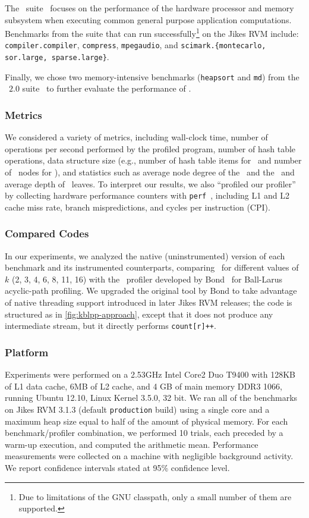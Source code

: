 The \specjvm\ suite~\cite{SpecJVM2008} focuses on the performance of the hardware processor and memory subsystem when executing common general purpose application computations. Benchmarks from the suite that can run successfully\footnote{Due to limitations of the GNU classpath, only a small number of them are supported.} on the Jikes RVM include: {\tt compiler.compiler}, {\tt compress}, {\tt mpegaudio}, and {\tt scimark.\{montecarlo, sor.large, sparse.large\}}.

Finally, we chose two memory-intensive benchmarks ({\tt heapsort} and {\tt md}) from the \javagrande\ $2.0$ suite~\cite{Bull99} to further evaluate the performance of \kblpp.

\subsubsection*{Metrics}
We considered a variety of metrics, including wall-clock time, number of operations per second performed by the profiled program, number of hash table operations, data structure size (e.g., number of hash table items for \blpp\ and number of \ksf\ nodes for \kblpp), and statistics such as average node degree of the \ksf\ and the \kipf\ and average depth of \kipf\ leaves. To interpret our results, we also ``profiled our profiler'' by collecting hardware performance counters with {\tt perf}~\cite{perf}, including L1 and L2 cache miss rate, branch mispredictions, and cycles per instruction (CPI).

\subsubsection*{Compared Codes}
In our experiments, we analyzed the native (uninstrumented) version of each benchmark and its instrumented counterparts, comparing \kblpp\ for different values of $k$ (2, 3, 4, 6, 8, 11, 16) with the \blpp\ profiler developed by Bond~\cite{PEP} for Ball-Larus acyclic-path profiling. We upgraded the original tool by Bond to take advantage of native threading support introduced in later Jikes RVM releases; the code is structured as in \myfigure\ref{fig:kblpp-approach}, except that it does not produce any intermediate stream, but it directly performs {\tt count[r]++}.

\subsubsection*{Platform}
Experiments were performed on a 2.53GHz Intel Core2 Duo T9400 with 128KB of L1 data cache, 6MB of L2 cache, and 4 GB of main memory DDR3 1066, running Ubuntu 12.10, Linux Kernel 3.5.0, 32 bit. We ran all of the benchmarks on Jikes RVM 3.1.3 (default {\tt production} build) using a single core and a maximum heap size equal to half of the amount of physical memory. For each benchmark/profiler combination, we performed 10 trials, each preceded by a warm-up execution, and computed the arithmetic mean. Performance measurements were collected on a machine with negligible background activity. We report confidence intervals stated at 95\% confidence level.

